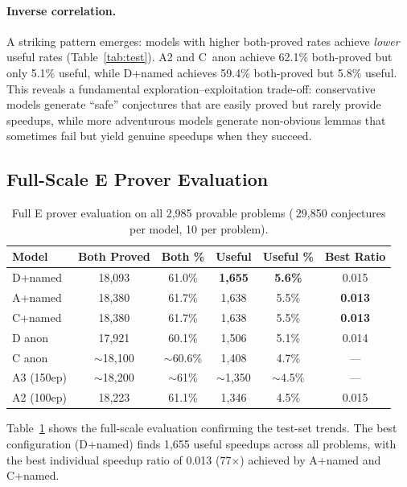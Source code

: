 \documentclass{article}
\begin{document}
\paragraph{Inverse correlation.}
A striking pattern emerges: models with higher both-proved rates achieve
\emph{lower} useful rates (Table~\ref{tab:test}). A2 and C~anon achieve 62.1\%
both-proved but only 5.1\% useful, while D+named achieves 59.4\% both-proved
but 5.8\% useful. This reveals a fundamental exploration--exploitation trade-off:
conservative models generate ``safe'' conjectures that are easily proved but
rarely provide speedups, while more adventurous models generate non-obvious
lemmas that sometimes fail but yield genuine speedups when they succeed.

\subsection{Full-Scale E Prover Evaluation}

\begin{table}[t]
\centering
\caption{Full E prover evaluation on all 2,985 provable problems (${~}$29,850
conjectures per model, 10 per problem).}
\label{tab:full_eval}
\begin{tabular}{lccccc}
\toprule
\textbf{Model} & \textbf{Both Proved} & \textbf{Both \%} & \textbf{Useful} & \textbf{Useful \%} & \textbf{Best Ratio} \\
\midrule
D+named       & 18,093 & 61.0\% & \textbf{1,655} & \textbf{5.6\%} & 0.015 \\
A+named       & 18,380 & 61.7\% & 1,638 & 5.5\% & \textbf{0.013} \\
C+named       & 18,380 & 61.7\% & 1,638 & 5.5\% & \textbf{0.013} \\
D anon        & 17,921 & 60.1\% & 1,506 & 5.1\% & 0.014 \\
C anon        & ${\sim}$18,100 & ${\sim}$60.6\% & 1,408 & 4.7\% & --- \\
A3 (150ep)    & ${\sim}$18,200 & ${\sim}$61\% & ${\sim}$1,350 & ${\sim}$4.5\% & --- \\
A2 (100ep)    & 18,223 & 61.1\% & 1,346 & 4.5\% & 0.015 \\
\bottomrule
\end{tabular}
\end{table}

Table~\ref{tab:full_eval} shows the full-scale evaluation confirming the test-set
trends. The best configuration (D+named) finds 1,655 useful speedups across all
problems, with the best individual speedup ratio of 0.013 (77$\times$) achieved by
A+named and C+named.
\end{document}
